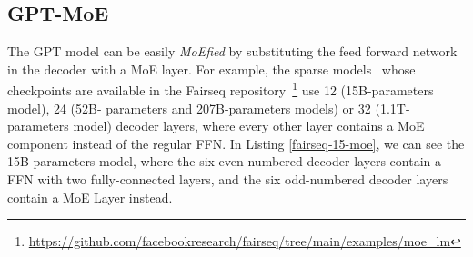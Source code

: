 \subsection{GPT-MoE}\label{gpt-moe}
The GPT model can be easily \textit{MoEfied} by substituting the feed forward network in the decoder with a MoE layer. For example, the sparse models~\cite{fairseq-checkpoint} whose checkpoints are available in the Fairseq repository~\footnote{\url{https://github.com/facebookresearch/fairseq/tree/main/examples/moe_lm}} use 12 (15B-parameters model), 24 (52B- parameters and 207B-parameters models) or 32 (1.1T-parameters model) decoder layers, where every other layer contains a MoE component instead of the regular FFN. In Listing \ref{fairseq-15-moe}, we can see the 15B parameters model, where the six even-numbered decoder layers contain a FFN with two fully-connected layers, and the six odd-numbered decoder layers contain a MoE Layer instead.

